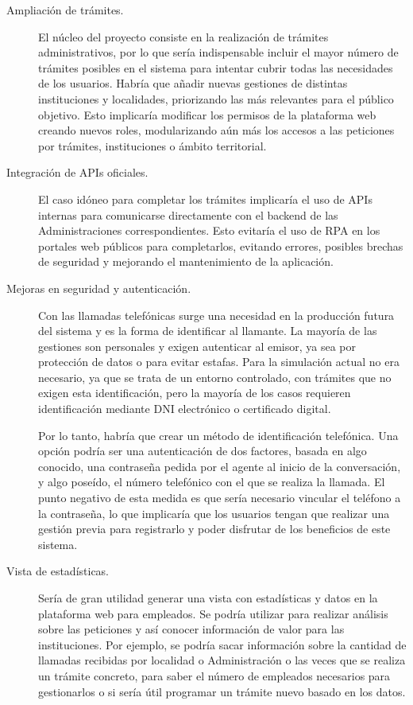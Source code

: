     \begin{description}
        \item[Ampliación de trámites.] El núcleo del proyecto consiste en la realización de trámites administrativos, por lo que sería indispensable incluir el mayor número de trámites posibles en el sistema para intentar cubrir todas las necesidades de los usuarios. 
            Habría que añadir nuevas gestiones de distintas instituciones y localidades, priorizando las más relevantes para el público objetivo. 
            Esto implicaría modificar los permisos de la plataforma web creando nuevos roles, modularizando aún más los accesos a las peticiones por trámites, instituciones o ámbito territorial. 

        \item[Integración de APIs oficiales.] El caso idóneo para completar los trámites implicaría el uso de APIs internas para comunicarse directamente con el backend de las Administraciones correspondientes. 
            Esto evitaría el uso de RPA en los portales web públicos para completarlos, evitando errores, posibles brechas de seguridad y mejorando el mantenimiento de la aplicación.

        \item[Mejoras en seguridad y autenticación.] Con las llamadas telefónicas surge una necesidad en la producción futura del sistema y es la forma de identificar al llamante. 
            La mayoría de las gestiones son personales y exigen autenticar al emisor, ya sea por protección de datos o para evitar estafas. 
            Para la simulación actual no era necesario, ya que se trata de un entorno controlado, con trámites que no exigen esta identificación, pero la mayoría de los casos requieren identificación mediante DNI electrónico o certificado digital. 
            
            Por lo tanto, habría que crear un método de identificación telefónica. 
            Una opción podría ser una autenticación de dos factores, basada en algo conocido, una contraseña pedida por el agente al inicio de la conversación, y algo poseído, el número telefónico con el que se realiza la llamada. 
            El punto negativo de esta medida es que sería necesario vincular el teléfono a la contraseña, lo que implicaría que los usuarios tengan que realizar una gestión previa para registrarlo y poder disfrutar de los beneficios de este sistema. 

        \item[Vista de estadísticas.] Sería de gran utilidad generar una vista con estadísticas y datos en la plataforma web para empleados. 
            Se podría utilizar para realizar análisis sobre las peticiones y así conocer información de valor para las instituciones. 
            Por ejemplo, se podría sacar información sobre la cantidad de llamadas recibidas por localidad o Administración o las veces que se realiza un trámite concreto, para saber el número de empleados necesarios para gestionarlos o si sería útil programar un trámite nuevo basado en los datos. 


\end{description}
